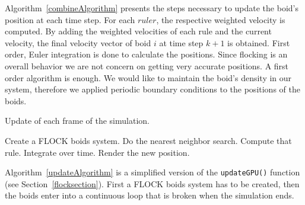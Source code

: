 Algorithm~\ref{combineAlgorithm} presents the steps necessary to update the boid's position at each time step. For each $rule r$, the respective weighted velocity is computed. By adding the weighted velocities of each rule and the current velocity, the final velocity vector of boid $i$ at time step $k+1$ is obtained. First order, Euler integration is done to calculate the positions. Since flocking is an overall behavior we are not concern on getting very accurate positions. A first order algorithm is enough. We would like to maintain the boid's density in our system, therefore we applied periodic boundary conditions to the positions of the boids.
 
\begin{algorithm}
\caption{Update of each frame of the simulation.}
\label{updateAlgorithm}
\begin{algorithmic}
\STATE Create a FLOCK boids system.
\STATE Do the nearest neighbor search.
\STATE Compute that rule.
\STATE Integrate over time.
\STATE Render the new position.
\ENDFOR
\end{algorithmic}
\end{algorithm}

Algorithm~\ref{updateAlgorithm} is a simplified version of the \texttt{updateGPU()} function (see Section~\ref{flocksection}). First a FLOCK boids system has to be created, then the boids enter into a continuous loop that is broken when the simulation ends. 
